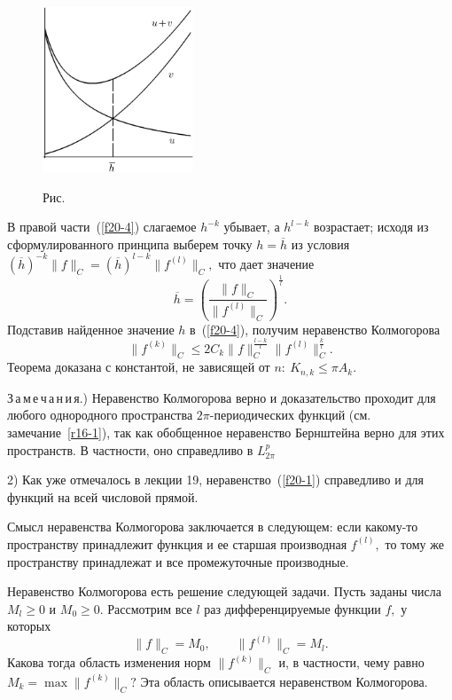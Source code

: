 \begin{figure}[ht]
\begin{center}
\includegraphics[width=0.4\textwidth]{pict/pict20-1.eps}
\end{center}
 \bigskip
 \label{r20-1}

 \centerline{Рис.~\theris}
 \bigskip
\end{figure}


В правой части~(\ref{f20-4}) слагаемое  $h^{-k}$ убывает, а $h^{l-k}$
возрастает; исходя из сформулированного принципа выберем точку
 $h=\overline h$ из
 условия $(\overline h)^{-k}\|f\|_C=(\overline h)^{l-k}\|f^{(l)}\|_C,$ что дает значение
 $$
  \overline h=\left( \frac{\|f\|_C}{\|f^{(l)}\|_C}\right)^{\frac{1}{l}}.
 $$
 Подставив найденное значение $h$
 в~(\ref{f20-4}), получим неравенство Колмогорова
 $$
 \|f^{(k)}\|_C\le {2C_k}\|f\|_C^{\frac{l-k}{l}}\|f^{(l)}\|_C^{\frac{k}{l}}.
 $$
 Теорема доказана с константой, не зависящей от $n:\ K_{n,k}\le \pi A_k.$

 З\,а\,м\,е\,ч\,а\,н\,и\,я.) Неравенство Колмогорова верно   и доказательство проходит
 для любого однородного пространства
 $2\pi$-периодических функций (см. замечание~\ref{r16-1}), так как
 обобщенное неравенство Бернштейна верно для этих
 пространств. В частности, оно справедливо в $L_{2\pi}^p$

 2) Как уже отмечалось в лекции 19, неравенство~(\ref{f20-1}) справедливо и для функций на всей
 числовой прямой.


 Смысл неравенства Колмогорова заключается в
 следующем: если какому-то пространству принадлежит
 функция и ее старшая производная $f^{(l)},$
 то тому же пространству принадлежат и все промежуточные
 производные.

 Неравенство Колмогорова есть решение следующей
  задачи. Пусть  заданы числа $M_l\ge 0$ и $M_0\ge 0.$
 Рассмотрим все $l$ раз дифференцируемые функции $f,$
  у которых
 $$
 \|f\|_C=M_0,\qquad \|f^{(l)}\|_C=M_l.
 $$
 Какова тогда область изменения норм $\|f^{(k)}\|_C$
 и, в частности,  чему равно $M_k=\max\|f^{(k)}\|_C?$
 Эта область описывается неравенством Колмогорова.

